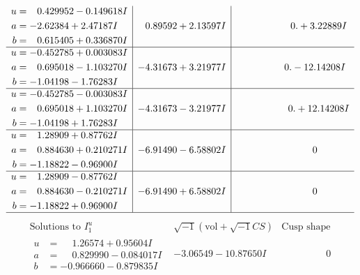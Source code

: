 \documentclass[1p]{elsarticle_modified}
\theoremstyle{definition}
\newcommand{\I}{\sqrt{-1}}
\begin{document}
$$\begin{array}{c|c|c}
\begin{aligned}
u &= \phantom{-}0.429952 - 0.149618 I \\
a &= -2.62384 + 2.47187 I \\
b &= \phantom{-}0.615405 + 0.336870 I\end{aligned}
 & \phantom{-}0.89592 + 2.13597 I & \phantom{-0.000000 -}0. + 3.22889 I \\ \hline\begin{aligned}
u &= -0.452785 + 0.003083 I \\
a &= \phantom{-}0.695018 - 1.103270 I \\
b &= -1.04198 - 1.76283 I\end{aligned}
 & -4.31673 + 3.21977 I & \phantom{-0.000000 } 0. - 12.14208 I \\ \hline\begin{aligned}
u &= -0.452785 - 0.003083 I \\
a &= \phantom{-}0.695018 + 1.103270 I \\
b &= -1.04198 + 1.76283 I\end{aligned}
 & -4.31673 - 3.21977 I & \phantom{-0.000000 -}0. + 12.14208 I \\ \hline\begin{aligned}
u &= \phantom{-}1.28909 + 0.87762 I \\
a &= \phantom{-}0.884630 + 0.210271 I \\
b &= -1.18822 - 0.96900 I\end{aligned}
 & -6.91490 - 6.58802 I & \phantom{-0.000000 } 0 \\ \hline\begin{aligned}
u &= \phantom{-}1.28909 - 0.87762 I \\
a &= \phantom{-}0.884630 - 0.210271 I \\
b &= -1.18822 + 0.96900 I\end{aligned}
 & -6.91490 + 6.58802 I & \phantom{-0.000000 } 0\\
 \hline 
 \end{array}$$\newpage$$\begin{array}{c|c|c}  
\text{Solutions to }I^u_{1}& \I (\text{vol} + \sqrt{-1}CS) & \text{Cusp shape}\\
 \hline 
\begin{aligned}
u &= \phantom{-}1.26574 + 0.95604 I \\
a &= \phantom{-}0.829990 - 0.084017 I \\
b &= -0.966660 - 0.879835 I\end{aligned}
 & -3.06549 - 10.87650 I & \phantom{-0.000000 } 0 \\ \hline\begin{aligned}

\end{aligned}
\end{array}$$
\end{document}
